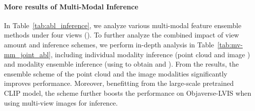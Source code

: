 \documentclass{article} \usepackage{iclr2024_conference,times}
\begin{document}
\paragraph{More results of Multi-Modal Inference}
In Table~\ref{tab:abl_inference}, we analyze various multi-modal feature ensemble methods under four views ().
To further analyze the combined impact of view amount and inference schemes, we perform in-depth analysis in Table~\ref{tab:mv-mm_joint_abl}, including individual modality inference (point cloud  and image ) and modality ensemble inference (using  to obtain  and ).
From the results, the ensemble scheme of the point cloud and the image modalities significantly improves performance.
Moreover, benefitting from the large-scale pretrained CLIP model, the  scheme further boosts the performance on Objaverse-LVIS when using multi-view images for inference.
\end{document}
